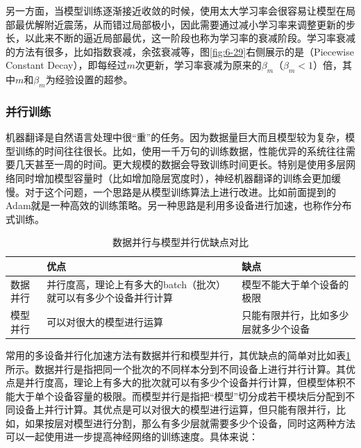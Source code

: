 \noindent 另一方面，当模型训练逐渐接近收敛的时候，使用太大学习率会很容易让模型在局部最优解附近震荡，从而错过局部极小，因此需要通过减小学习率来调整更新的步长，以此来不断的逼近局部最优，这一阶段也称为学习率的衰减阶段。学习率衰减的方法有很多，比如指数衰减，余弦衰减等，图\ref{fig:6-29}右侧展示的是{\small{}}（Piecewise Constant Decay），即每经过$m$次更新，学习率衰减为原来的$\beta_m$（$\beta_m<1$）倍，其中$m$和$\beta_m$为经验设置的超参。

\vspace{0.5em}
\subsubsection{并行训练}

\vspace{0.5em}
\parinterval 机器翻译是自然语言处理中很``重''的任务。因为数据量巨大而且模型较为复杂，模型训练的时间往往很长。比如，使用一千万句的训练数据，性能优异的系统往往需要几天甚至一周的时间。更大规模的数据会导致训练时间更长。特别是使用多层网络同时增加模型容量时（比如增加隐层宽度时），神经机器翻译的训练会更加缓慢。对于这个问题，一个思路是从模型训练算法上进行改进。比如前面提到的Adam就是一种高效的训练策略。另一种思路是利用多设备进行加速，也称作分布式训练。

\vspace{0.5em}
\begin{table}[htp]
\centering
\caption{ 数据并行与模型并行优缺点对比}
\label{tab:6-9}
\begin{tabular}{l | p{12em}  p{12em} }
	 		 &优点		&缺点 \\ \hline
\rule{0pt}{15pt}	数据并行 &并行度高，理论上有多大的batch（批次）就可以有多少个设备并行计算	&模型不能大于单个设备的极限 \\
\rule{0pt}{15pt}	模型并行	&可以对很大的模型进行运算	&只能有限并行，比如多少层就多少个设备 \\
\end{tabular}
\end{table}

\parinterval 常用的多设备并行化加速方法有数据并行和模型并行，其优缺点的简单对比如表\ref{tab:6-9}所示。数据并行是指把同一个批次的不同样本分到不同设备上进行并行计算。其优点是并行度高，理论上有多大的批次就可以有多少个设备并行计算，但模型体积不能大于单个设备容量的极限。而模型并行是指把``模型''切分成若干模块后分配到不同设备上并行计算。其优点是可以对很大的模型进行运算，但只能有限并行，比如，如果按层对模型进行分割，那么有多少层就需要多少个设备，同时这两种方法可以一起使用进一步提高神经网络的训练速度。具体来说：

